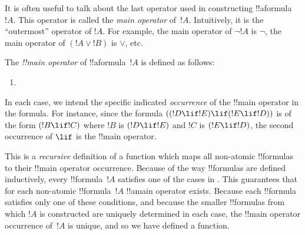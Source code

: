 \documentclass[../../../include/open-logic-section]{subfiles}
\begin{document}


\begin{explain}
It is often useful to talk about the last operator used in
constructing !!a{formula}~$!A$.  This operator is called the \emph{main
  operator} of~$!A$. Intuitively, it is the ``outermost'' operator
of $!A$. For example, the main operator of $\lnot !A$ is $\lnot$,
the main operator of $(!A \lor !B)$ is $\lor$, etc.
\end{explain}


\begin{defn}
The \emph{!!{main operator}} of !!a{formula}~$!A$ is
defined as follows:
\begin{enumerate}
\item {}







\end{enumerate}
\end{defn}

In each case, we intend the specific indicated \emph{occurrence} of
the !!{main operator} in the formula. For instance, since the formula
$((!D \lif !E) \lif (!E \lif !D))$ is of the form $(!B \lif !C)$ where
$!B$ is $(!D \lif !E)$ and $!C$ is $(!E \lif !D)$, the second
occurrence of $\lif$ is the !!{main operator}.

\begin{explain}
This is a \emph{recursive} definition of a function which maps all
non-atomic !!{formula}s to their !!{main operator} occurrence. Because
of the way !!{formula}s are defined inductively, every
!!{formula}~$!A$ satisfies one of the cases in .
This guarantees that for each non-atomic !!{formula}~$!A$ !!a{main
  operator} exists. Because each !!{formula} satisfies only one of these
conditions, and because the smaller !!{formula}s from which $!A$ is
constructed are uniquely determined in each case, the !!{main
  operator} occurrence of~$!A$ is unique, and so we have defined a
function.
\end{explain}
\end{document}
